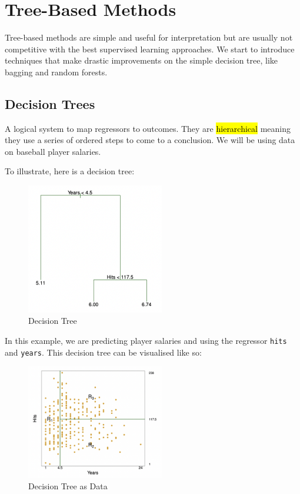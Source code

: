 \documentclass[11pt]{article}
\begin{document}
\newpage

\section{Tree-Based Methods}

Tree-based methods are simple and useful for interpretation but are usually not competitive with the best supervised learning approaches. We start to introduce techniques that make drastic improvements on the simple decision tree, like bagging and random forests.


\subsection{Decision Trees}

A logical system to map regressors to outcomes. They are \hl{hierarchical} meaning they use a series of ordered steps to come to a conclusion. We will be using data on baseball player salaries.

To illustrate, here is a decision tree:

\begin{figure}[h]
    \centering
    \includegraphics[width=6cm]{pic/decision tree.png}
    \caption{Decision Tree}
    \label{fig:decision tree}
\end{figure}

In this example, we are predicting player salaries and using the regressor \lstinline{hits} and \lstinline{years}. This decision tree can be visualised like so:

\begin{figure}[h]
    \centering
    \includegraphics[width=6cm]{pic/decision tree parts.png}
    \caption{Decision Tree as Data}
    \label{fig:decision tree parts}
\end{figure}
\end{document}

